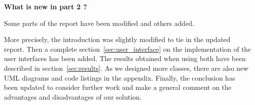 \vspace*{5cm}
  
{\setlength{\parindent}{0pt}

  \textbf{What is new in part 2 ?}
  
  Some parts of the report have been modified and others added.

  More precisely, the introduction was slightly modified to
  tie in the updated report.
  Then a complete section~\ref{sec:user_interface} on
  the implementation of the user interfaces has been added.
  The results obtained when using both have been described in section~\ref{sec:results}.
  As we designed more classes, there are also new UML diagrams and code listings
  in the appendix.
  Finally, the conclusion has been updated to consider further work and
  make a general comment on the advantages and disadvantages of our solution.
  
}